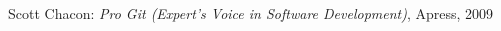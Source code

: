 \documentclass[11pt,a4paper,oneside, 
liststotoc, 					%
bibtotoc,						%
titlepage, 						%
headsepline, 					%
BCOR6mm,						%
]{scrreprt}
\begin{document}
\setcounter{secnumdepth}{3}	%
\setcounter{tocdepth}{3}
\sffamily									  %



\tableofcontents							%
\printnomenclature[2.0cm]			%
\listoffigures 								%
\pagebreak

\pagestyle{fancy}					
\rmfamily






\begin{thebibliography}{999999}

 Scott Chacon: \emph{Pro Git (Expert's Voice in Software Development)}, Apress, 2009

\end{thebibliography}


\begin{appendix}
\clearpage
{}
\end{appendix}
\end{document}

